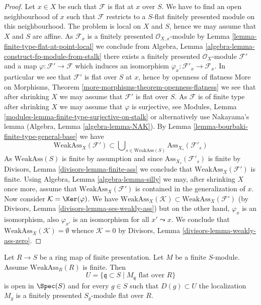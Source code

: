 \begin{proof}
Let $x \in X$ be such that $\mathcal{F}$ is flat at $x$ over $S$.
We have to find an open neighbourhood of $x$ such that $\mathcal{F}$ restricts
to a $S$-flat finitely presented module on this neighbourhood.
The problem is local on $X$ and $S$, hence we may assume that $X$ and $S$
are affine. As $\mathcal{F}_x$ is a finitely presented
$\mathcal{O}_{X, x}$-module by
Lemma \ref{lemma-finite-type-flat-at-point-local}
we conclude from
Algebra, Lemma \ref{algebra-lemma-construct-fp-module-from-stalk}
there exists a finitely presented $\mathcal{O}_X$-module $\mathcal{F}'$
and a map $\varphi : \mathcal{F}' \to \mathcal{F}$ which induces
an isomorphism $\varphi_x : \mathcal{F}'_x \to \mathcal{F}_x$. In particular
we see that $\mathcal{F}'$ is flat over $S$ at $x$, hence by openness
of flatness
More on Morphisms, Theorem \ref{more-morphisms-theorem-openness-flatness}
we see that after shrinking $X$ we may assume that
$\mathcal{F}'$ is flat over $S$. As $\mathcal{F}$ is of finite type
after shrinking $X$ we may assume that $\varphi$ is surjective, see
Modules, Lemma \ref{modules-lemma-finite-type-surjective-on-stalk}
or alternatively use Nakayama's lemma
(Algebra, Lemma \ref{algebra-lemma-NAK}).
By
Lemma \ref{lemma-bourbaki-finite-type-general-base}
we have
$$
\text{WeakAss}_X(\mathcal{F}') \subset
\bigcup\nolimits_{s \in \text{WeakAss}(S)} \text{Ass}_{X_s}(\mathcal{F}'_s)
$$
As $\text{WeakAss}(S)$ is finite by assumption and since
$\text{Ass}_{X_s}(\mathcal{F}'_s)$ is finite by
Divisors, Lemma \ref{divisors-lemma-finite-ass}
we conclude that $\text{WeakAss}_X(\mathcal{F}')$ is finite. Using
Algebra, Lemma \ref{algebra-lemma-silly}
we may, after shrinking $X$ once more, assume that
$\text{WeakAss}_X(\mathcal{F}')$ is contained in the generalization
of $x$. Now consider $\mathcal{K} = \Ker(\varphi)$. We have
$\text{WeakAss}_X(\mathcal{K}) \subset \text{WeakAss}_X(\mathcal{F}')$
(by
Divisors, Lemma \ref{divisors-lemma-ses-weakly-ass})
but on the other hand, $\varphi_x$ is an isomorphism, also $\varphi_{x'}$
is an isomorphism for all $x' \leadsto x$. We conclude that
$\text{WeakAss}_X(\mathcal{K}) = \emptyset$ whence
$\mathcal{K} = 0$ by
Divisors, Lemma \ref{divisors-lemma-weakly-ass-zero}.
\end{proof}

\begin{lemma}
\label{lemma-finite-type-flat-algebra}
Let $R \to S$ be a ring map of finite presentation.
Let $M$ be a finite $S$-module. Assume $\text{WeakAss}_R(R)$ is finite.
Then
$$
U = \{\mathfrak q \subset S \mid M_{\mathfrak q}\text{ flat over }R\}
$$
is open in $\Spec(S)$ and for every $g \in S$ such that
$D(g) \subset U$ the localization $M_g$ is a finitely presented
$S_g$-module flat over $R$.
\end{lemma}


